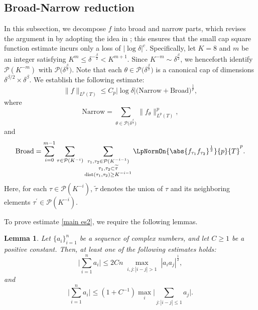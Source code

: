 \documentclass[reqno,centertags,11pt,a4paper]{amsart}
\newtheorem{lemma}[definition]{Lemma}
\begin{document}
\subsection{Broad-Narrow reduction}
In this subsection, we decompose $f$ into broad and narrow parts, which revises the argument in \cite{DGW20} by adopting the idea in \cite{GMW24, Johnsrude23}; this ensures that the small cap square function estimate incurs only a loss of $|\log\delta|^c$. Specifically, let $K=8$ and $m$ be an integer satisfying $K^m\leq\delta^{-\frac{\beta}{2}}<K^{m+1}$. Since $K^{-m} \sim \delta^{\frac{\beta}{2}}$, we henceforth identify $\mathcal{P}(K^{-m})$ with $\mathcal{P}\bigl(\delta^{\frac{\beta}{2}}\bigr)$. Note that each $\theta \in \mathcal{P}\bigl(\delta^{\frac{\beta}{2}}\bigr)$ is a canonical cap of dimensions $\delta^{\beta/2} \times \delta^\beta$. We establish the following estimate:
\begin{equation}\label{main es2}
          \|f\|_{L^p(T)} \leq C_p |\log\delta| \Big( \text{Narrow} + \text{Broad}\Big)^{\frac{1}{p}},
      \end{equation}
where
\begin{equation}\label{narrow}
      \text{Narrow} = \sum_{\theta \in \mathcal{P}\bigl(\delta^{\frac{\beta}{2}}\bigr)} \|f_\theta\|_{L^p(T)}^p,
      \end{equation}
and
\begin{equation}\label{broad}
      \text{Broad} = \sum_{i=0}^{m-1} \sum_{\tau \in \mathcal{P}(K^{-i})} \sum_{\substack{ \tau_1,\tau_2 \in \mathcal{P}(K^{-i-1}) \\ \tau_1,\tau_2 \subset \widetilde{\tau} \\ \text{dist}(\tau_1,\tau_2) \geq  K^{-i-1} }} \LpNormOn{\abs{f_{\tau_1}f_{\tau_2}}^\frac{1}{2}}{p}{T}^p.
      \end{equation}
      Here, for each $\tau\in \mathcal{P}(K^{-i})$, $\widetilde{\tau}$ denotes the union of $\tau$ and its neighboring elements $\tau^\prime\in\mathcal{P}(K^{-i})$.


To prove estimate \eqref{main es2}, we require the following lemmas.
\begin{lemma}\label{inarrow}
    Let $\{a_i\}_{i=1}^n$ be a sequence of complex numbers, and let $C\geq1$ be a positive constant. Then, at least one of the following estimates holds:
    \begin{equation}
        \bigg|\sum_{i=1}^n a_i\bigg|\leq 2C n \max_{\substack{i,j:|i-j|>1}}|a_ia_j|^{\frac{1}{2}},
    \end{equation}
    and
    \begin{equation}
        \bigg|\sum_{i=1}^n a_i\bigg|\leq \left(1+C^{-1}\right)\max_{i}\bigg|\sum_{j:|i-j|\leq1}a_j\bigg|.
    \end{equation}
\end{lemma}
\end{document}
